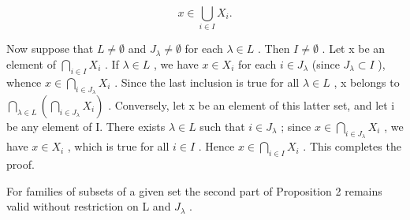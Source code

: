 \[
x \in \bigcup_ {i \in I} X _ {i}.
\]

Now suppose that \(L \neq \emptyset\) and \(J_{\lambda} \neq \emptyset\) for each \(\lambda \in L\) . Then \(I \neq \emptyset\) . Let x be an element of \(\bigcap_{i \in I} X_{i}\) . If \(\lambda \in L\) , we have \(x \in X_{i}\) for each \(i \in J_{\lambda}\) (since \(J_{\lambda} \subset I\) ), whence \(x \in \bigcap_{i \in J_{\lambda}} X_{i}\) . Since the last inclusion is true for all \(\lambda \in L\) , x belongs to \(\bigcap_{\lambda \in L} \left( \bigcap_{i \in J_{\lambda}} X_{i} \right)\) . Conversely, let x be an element of this latter set, and let i be any element of I. There exists \(\lambda \in L\) such that \(i \in J_{\lambda}\) ; since \(x \in \bigcap_{i \in J_{\lambda}} X_{i}\) , we have \(x \in X_{i}\) , which is true for all \(i \in I\) . Hence \(x \in \bigcap_{i \in I} X_{i}\) . This completes the proof.

For families of subsets of a given set the second part of Proposition 2 remains valid without restriction on L and \(J_{\lambda}\) .

